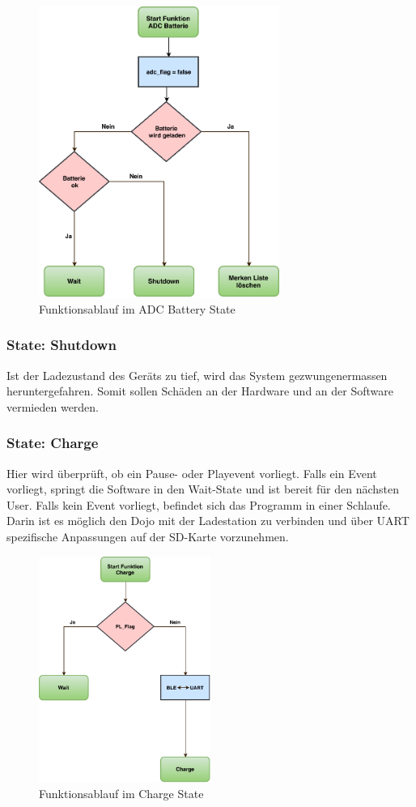 \begin{figure}[htbp!!!!]
	\centering
	\includegraphics[width=0.7\textwidth]{Data/ADC_Battery_picture.pdf}
	\caption[Statemachine: ADC Battery]{Funktionsablauf im ADC Battery State}
	\label{fig:adcBatteryState}
\end{figure} 

\subsubsection*{State: Shutdown}

Ist der Ladezustand des Geräts zu tief, wird das System gezwungenermassen heruntergefahren. Somit sollen Schäden an der Hardware und an der Software vermieden werden.

\subsubsection*{State: Charge}

Hier wird überprüft, ob ein Pause- oder Playevent vorliegt. Falls ein Event vorliegt, springt die Software in den Wait-State und ist bereit für den nächsten User. Falls kein Event vorliegt, befindet sich das Programm in einer Schlaufe. Darin ist es möglich den Dojo mit der Ladestation zu verbinden und über UART spezifische Anpassungen auf der SD-Karte vorzunehmen.

\begin{figure}[htbp!!!!]
	\centering
	\includegraphics[width=0.5\textwidth]{Data/Charge_picture.pdf}
	\caption[Statemachine: Charge]{Funktionsablauf im Charge State}
	\label{fig:chargeState}
\end{figure} 
